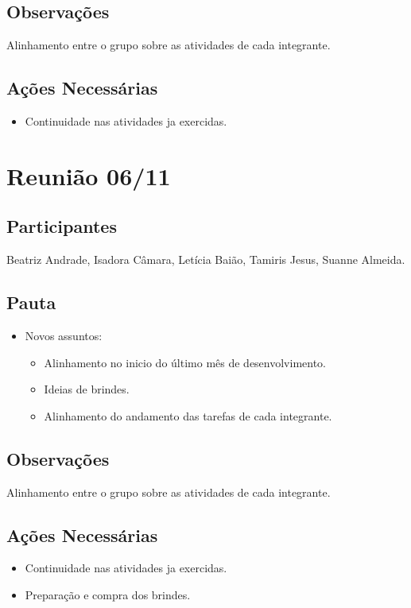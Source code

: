 \begin{apendicesenv}
\subsection*{Observações}
Alinhamento entre o grupo sobre as atividades de cada integrante.

\subsection*{Ações Necessárias}
\begin{itemize}
    \item Continuidade nas atividades ja exercidas.
\end{itemize}

\section*{Reunião 06/11}

\subsection*{Participantes}
Beatriz Andrade, Isadora Câmara, Letícia Baião, Tamiris Jesus, Suanne Almeida.

\subsection*{Pauta}
\begin{itemize}
    \item Novos assuntos:
    \begin{itemize}
        \item Alinhamento no inicio do último mês de desenvolvimento.
        \item Ideias de brindes.
        \item Alinhamento do andamento das tarefas de cada integrante.
    \end{itemize}
\end{itemize}

\subsection*{Observações}
Alinhamento entre o grupo sobre as atividades de cada integrante.

\subsection*{Ações Necessárias}
\begin{itemize}
    \item Continuidade nas atividades ja exercidas.
    \item Preparação e compra dos brindes.
\end{itemize}


\end{apendicesenv}
